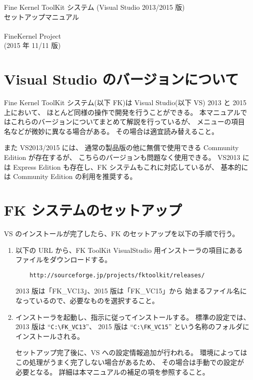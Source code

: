 \documentclass[a4j]{jarticle}
\begin{document}
\begin{center}
{\Large Fine Kernel ToolKit システム (Visual Studio 2013/2015 版) \\
	セットアップマニュアル} \\ ~ \\
{\Large FineKernel Project} \\
(2015 年 11/11 版)
\end{center}


\section{Visual Studio のバージョンについて}
Fine Kernel ToolKit システム(以下 FK)は 
Visual Studio(以下 VS) 2013 と 2015 上において、
ほとんど同様の操作で開発を行うことができる。
本マニュアルではこれらのバージョンについてまとめて解説を行っているが、
メニューの項目名などが微妙に異なる場合がある。
その場合は適宜読み替えること。

また VS2013/2015 には、
通常の製品版の他に無償で使用できる Community Edition が存在するが、
こちらのバージョンも問題なく使用できる。
VS2013 には Express Edition も存在し、FK システムもこれに対応しているが、
基本的には Community Edition の利用を推奨する。

\section{FK システムのセットアップ}
VS のインストールが完了したら、FK のセットアップを以下の手順で行う。

\begin{enumerate}
\item 以下の URL から、FK ToolKit VisualStudio 用インストーラの項目にある
ファイルをダウンロードする。

\begin{verbatim}
    http://sourceforge.jp/projects/fktoolkit/releases/
\end{verbatim}

2013 版は「FK\_VC13」、2015 版は「FK\_VC15」から
始まるファイル名になっているので、必要なものを選択すること。

\item インストーラを起動し、指示に従ってインストールする。
標準の設定では、2013 版は ``\verb+C:\FK_VC13+''、
2015 版は ``\verb+C:\FK_VC15+'' という名称のフォルダにインストールされる。

セットアップ完了後に、VS への設定情報追加が行われる。
環境によってはこの処理がうまく完了しない場合があるため、
その場合は手動での設定が必要となる。
詳細は本マニュアルの補足の項を参照すること。


\end{enumerate}
\end{document}
